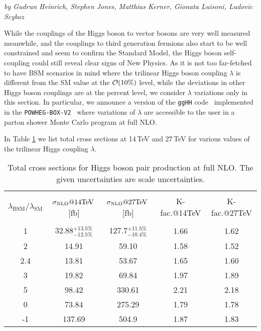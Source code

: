 \label{subsec:varylambda}

\begin{center}
\textit{by  Gudrun Heinrich, Stephen Jones, Matthias Kerner, Gionata Luisoni, Ludovic Scyboz}
\end{center}

While the couplings of the Higgs boson to vector bosons are very well measured meanwhile, 
and the couplings to third generation fermions also start to be well constrained and seem to confirm the Standard Model, 
the Higgs boson self-coupling could still reveal clear signs of New Physics. 
As it is not too far-fetched to have BSM scenarios in mind where the trilinear Higgs boson coupling $\lambda$ is different from the SM value at the ${\cal O}(10\%)$ level, while the deviations in other Higgs boson couplings are at the percent level, we consider $\lambda$ variations only in this section.
In particular, we announce a version of the {\tt ggHH} code~\cite{Borowka:2016ypz,Heinrich:2017kxx,Borowka:2016ehy} implemented in the {\tt POWHEG-BOX-V2}~\cite{Alioli:2010xd} where variations of  $\lambda$ are accessible to the user in a parton shower Monte Carlo program at full NLO.


In Table \ref{tab:sigmatot} we list total cross sections at 14\,TeV and 27\,TeV for various values of the trilinear Higgs coupling $\lambda$. 
\begin{table}[htb]
\begin{center}
\begin{tabular}{| c | c | c |c|c|}
\hline
&&&&\\
$\lambda_{\mathrm{BSM}}/\lambda_{\mathrm{SM}}$ & $\sigma_{\rm{NLO}}@14 \mathrm{TeV}$\,[fb] & $\sigma_{\rm{NLO}}@27 \mathrm{TeV}$\,[fb] &K-fac.@14TeV&K-fac.@27TeV\\
&&&&\\
\hline
1& 32.88$^{+13.5\%}_{-12.5\%}$&127.7$^{+11.5\%}_{-10.4\%}$ &1.66&1.62\\
\hline
2 & 14.91 &  59.10 & 1.58 & 1.52\\
\hline
2.4 & 13.81& 53.67 & 1.65 & 1.60\\
\hline
3& 19.82 & 69.84 & 1.97 & 1.89\\
\hline 
5 & 98.42& 330.61 & 2.21 & 2.18\\
\hline 
0 & 73.84& 275.29& 1.79 & 1.78 \\
\hline 
-1 & 137.69& 504.9 & 1.87 & 1.83\\
\hline
\end{tabular}
\end{center}
\caption{Total cross sections for Higgs boson pair production at full NLO. The given uncertainties are scale uncertainties. 
\label{tab:sigmatot}}
\end{table}

